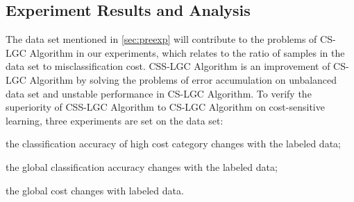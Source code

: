 \documentclass{svjour3}                     %
\begin{document}


\subsection{Experiment Results and Analysis}

The data set mentioned in \ref{sec:preexp} will contribute to the problems of CS-LGC Algorithm in our experiments, which relates to the ratio of samples in the data set to misclassification cost. CSS-LGC Algorithm is an improvement of CS-LGC Algorithm by solving the problems of error accumulation on unbalanced data set and unstable performance in CS-LGC Algorithm. To verify the superiority of CSS-LGC Algorithm to CS-LGC Algorithm on cost-sensitive learning, three experiments are set on the data set:
\begin{inparaenum}[(1)]
  \item the classification accuracy of high cost category changes with the labeled data;
  \item the global classification accuracy changes with the labeled data;
  \item the global cost changes with labeled data.
\end{inparaenum}
\end{document}
